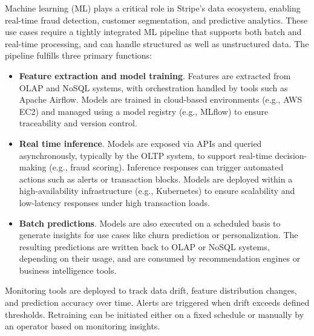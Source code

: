 \documentclass[11pt,a4paper,computermodern]{article}
\begin{document}
Machine learning (ML) plays a critical role in Stripe’s data ecosystem, enabling real-time fraud detection, customer segmentation, and predictive analytics. These use cases require a tightly integrated ML pipeline that supports both batch and real-time processing, and can handle structured as well as unstructured data. The pipeline fulfills three primary functions:
\begin{itemize}
	\item \textbf{Feature extraction and model training}. Features are extracted from OLAP and NoSQL systems, with orchestration handled by tools such as Apache Airflow. Models are trained in cloud-based environments (e.g., AWS EC2) and managed using a model registry (e.g., MLflow) to ensure traceability and version control.
	\item \textbf{Real time inference}. Models are exposed via APIs and queried asynchronously, typically by the OLTP system, to support real-time decision-making (e.g., fraud scoring). Inference responses can trigger automated actions such as alerts or transaction blocks. Models are deployed within a high-availability infrastructure (e.g., Kubernetes) to ensure scalability and low-latency responses under high transaction loads.
	\item \textbf{Batch predictions}. Models are also executed on a scheduled basis to generate insights for use cases like churn prediction or personalization. The resulting predictions are written back to OLAP or NoSQL systems, depending on their usage, and are consumed by recommendation engines or business intelligence tools.
\end{itemize}

Monitoring tools are deployed to track data drift, feature distribution changes, and prediction accuracy over time. Alerts are triggered when drift exceeds defined thresholds. Retraining can be initiated either on a fixed schedule or manually by an operator based on monitoring insights.
\end{document}
